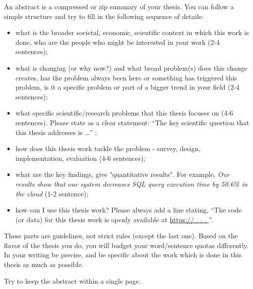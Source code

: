 \documentclass[twoside,11pt]{PhDthesisPSnPDF}
\begin{document}
%

\begin{abstracts} 
An abstract is a compressed or zip summary of your thesis. You can follow a simple structure and try to fill in the following sequence of details:
\begin{itemize}[leftmargin=10pt,itemindent=0em,nolistsep]
  \item what is the broader societal, economic, scientific context in which this work is done, who are the people who might be interested in your work (2-4 sentences);
  \item what is changing (or why now?) and what broad problem(s) does this change creates, has the problem always been here or something has triggered this problem, 
  is it a specific problem or part of a bigger trend in your field (2-4 sentences);
  \item what specific scientific/research problems that this thesis focuses on (4-6 sentences). Please state as a clear statement: ``The key scientific question that this thesis addresses is \ldots'' ;
  \item how does this thesis work tackle the problem - survey, design, implementation, evaluation (4-6 sentences);
  \item what are the key findings, give "quantitative results". For example, \textit{Our results show that our system decreases SQL query execution time by 50.6\% in the cloud} (1-2 sentence);
  \item how can I use this thesis work? Please always add a line stating, ``The code (or data) for this thesis work is openly available at \url{https:// . . . } ''.   
\end{itemize}

These parts are guidelines, not strict rules (except the last one). Based on the flavor of the thesis you do, you will budget your 
word/sentence quotas differently. In your writing be precise, and be specific about the work which is done in this thesis as much as possible. 

Try to keep the abstract within a single page. 
\end{abstracts}

%   
\end{document}
